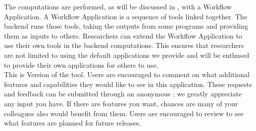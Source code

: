The computations are performed, as will be discussed in , with a Workflow Application. A Workflow Application is a sequence of tools linked together. The \texttt{\getsoftwarename{}} backend runs those tools, taking the outputs from some programs and providing them as inputs to others. Researchers can extend the Workflow Application to use their own tools in the backend computations. This ensures that researchers are not limited to using the default applications we provide and will be enthused to provide their own applications for others to use.\\

This is Version \getsoftwareversion{} of the tool. Users are
encouraged to comment on what additional features and capabilities
they would like to see in this application. These requests and
feedback can be submitted through an anonymous ; we greatly appreciate any input you have. If there are
features you want, chances are many of your colleagues also would
benefit from them. Users are encouraged to review
 to see what features are planned for future releases.
